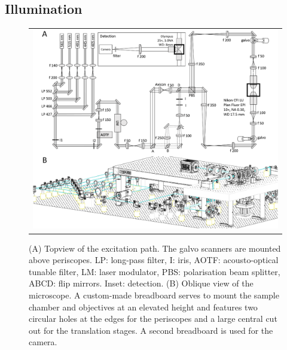 \documentclass[12pt]{spieman}  %
\begin{document}
	\subsection{Illumination}
		
		\begin{figure}
   \begin{center}
   \begin{tabular}{c}
   \includegraphics[width=\textwidth]{Panel2.eps}
   \end{tabular}
   \end{center}
   \caption{\label{fig:excitation} (A) Topview of the excitation path. The galvo scanners are mounted above periscopes. LP: long-pass filter, I: iris, AOTF: acousto-optical tunable filter, LM: laser modulator, PBS: polarisation beam splitter, ABCD: flip mirrors. Inset: detection. (B) Oblique view of the microscope. A custom-made breadboard serves to mount the sample chamber and objectives at an elevated height and features two circular holes at the edges for the periscopes and a large central cut out for the translation stages. A second breadboard is used for the camera.} 
   \end{figure}
		
\end{document}

